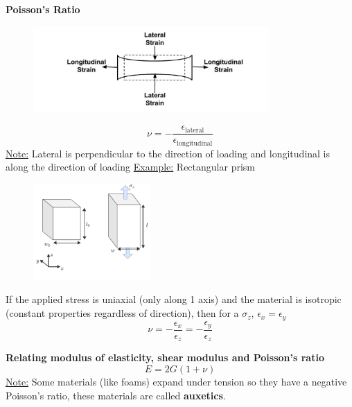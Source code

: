 \documentclass[12pt]{article}
\begin{document}
\noindent \textbf{Poisson's Ratio}
\begin{figure}[H]
    \centering
    \includegraphics[width=0.8\textwidth]{poissons.jpg}
\end{figure}
\[ \nu = -\frac{\epsilon_{\text{lateral}}}{\epsilon_{\text{longitudinal}}}\]
\underline{Note:} Lateral is perpendicular to the direction of loading and longitudinal is along the direction of loading
\newpage
\underline{Example:} Rectangular prism
\begin{figure}[H]
    \centering
    \includegraphics[width=0.4\textwidth]{poissons 2.png}
\end{figure}
\noindent If the applied stress is uniaxial (only along 1 axis) and the material is isotropic (constant properties regardless of direction), then for a $\sigma_z$, $\epsilon_x=\epsilon_y$
\[ \nu = -\frac{\epsilon_x}{\epsilon_z}= -\frac{\epsilon_y}{\epsilon_z}\]

\noindent \textbf{Relating modulus of elasticity, shear modulus and Poisson's ratio}
\[E=2G(1+\nu)\]
\underline{Note:} Some materials (like foams) expand under tension so they have a negative Poisson's ratio, these materials are called \textbf{auxetics}.
\newpage
\end{document}
